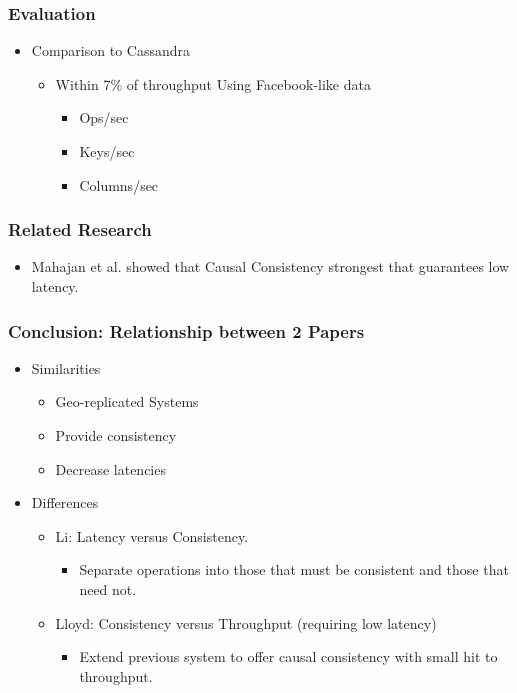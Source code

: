 \documentclass{beamer}
\begin{document}
\begin{frame}
\frametitle{Evaluation}
\begin{itemize}
\pause \item Comparison to Cassandra
		\begin{itemize}
			\item Within 7\% of throughput Using Facebook-like data
			\begin{itemize}
				\item Ops/sec
				\item Keys/sec
				\item Columns/sec
			\end{itemize}
		\end{itemize}
\end{itemize}  
\end{frame}

\begin{frame}
\frametitle{Related Research}
\begin{itemize}
\pause \item Mahajan et al. showed that Causal Consistency strongest that guarantees low latency.
\end{itemize}  
\end{frame}

\begin{frame}
\frametitle{Conclusion: Relationship between 2 Papers}
\begin{itemize}
\pause \item Similarities
	\begin{itemize}
		\item Geo-replicated Systems
		\item Provide consistency
		\item Decrease latencies
	\end{itemize}
\pause \item Differences
	\begin{itemize}
		\item Li: Latency versus Consistency.
			\begin{itemize}
				\item Separate operations into those that must be consistent and those that need not.
			\end{itemize}
		\item Lloyd: Consistency versus Throughput (requiring low latency)
			\begin{itemize}
				\item Extend previous system to offer causal consistency with small hit to throughput.
			\end{itemize}
	\end{itemize}

\end{itemize}  
\end{frame}
\end{document}
